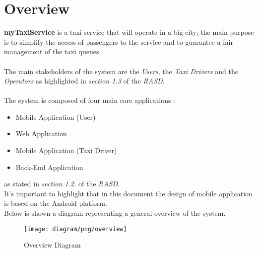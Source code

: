 \section{Overview} %
\label{sec:overview}
\textbf{myTaxiService} is a taxi service that will operate in a big city; the main purpose is to simplify the access of passengers to the service and to guarantee a fair management of the taxi queues.\\\\
The main stakeholders of the system are the \emph{Users}, the \emph{Taxi Drivers} and the \emph{Operators} as highlighted in \emph{section 1.3} of the \emph{RASD}.\\\\
The system is composed of four main core applications :
\begin{itemize}
	\item Mobile Application (User)
	\item Web Application
	\item Mobile Application (Taxi Driver)
	\item Back-End Application
\end{itemize}
 as stated in \emph{section 1.2.} of the \emph{RASD}.\\
 It's important to highlight that in this document the design of mobile application is based on the Android platform.\\
 Below is shown a diagram representing a general overview of the system.\\
\newpage
\vfill
\begin{figure}[h!t]
\caption{Overview Diagram}
\label{fig:overview-diagram}
\texttt{[image: diagram/png/overview]}
\centering
\end{figure}
\vfill
\clearpage


